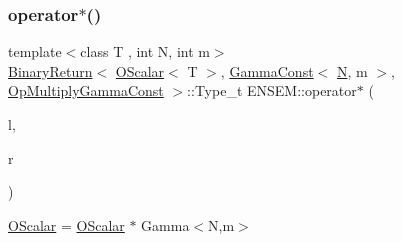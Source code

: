\subsubsection{\texorpdfstring{operator$\ast$()}{operator*()}\hspace{0.1cm}{\footnotesize\ttfamily [3/5]}}
{\footnotesize\ttfamily template$<$class T , int N, int m$>$ \\
\mbox{\hyperlink{structENSEM_1_1BinaryReturn}{Binary\+Return}}$<$ \mbox{\hyperlink{classENSEM_1_1OScalar}{O\+Scalar}}$<$ T $>$, \mbox{\hyperlink{classENSEM_1_1GammaConst}{Gamma\+Const}}$<$ \mbox{\hyperlink{adat__devel_2lib_2hadron_2operator__name__util_8cc_a7722c8ecbb62d99aee7ce68b1752f337}{N}}, m $>$, \mbox{\hyperlink{structENSEM_1_1OpMultiplyGammaConst}{Op\+Multiply\+Gamma\+Const}} $>$\+::Type\+\_\+t E\+N\+S\+E\+M\+::operator$\ast$ (\begin{DoxyParamCaption}\item[{const \mbox{\hyperlink{classENSEM_1_1OScalar}{O\+Scalar}}$<$ T $>$ \&}]{l,  }\item[{const \mbox{\hyperlink{classENSEM_1_1GammaConst}{Gamma\+Const}}$<$ \mbox{\hyperlink{adat__devel_2lib_2hadron_2operator__name__util_8cc_a7722c8ecbb62d99aee7ce68b1752f337}{N}}, m $>$ \&}]{r }\end{DoxyParamCaption})\hspace{0.3cm}{\ttfamily [inline]}}



\mbox{\hyperlink{classENSEM_1_1OScalar}{O\+Scalar}} = \mbox{\hyperlink{classENSEM_1_1OScalar}{O\+Scalar}} $\ast$ Gamma$<$\+N,m$>$ 

\mbox{\label{group__obsscalar_gadcaef62da25fe9015ccfbdc330caee50}} 
